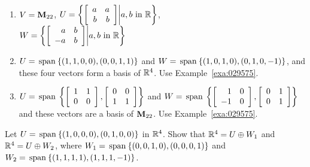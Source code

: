\begin{multicols}{2}
\begin{ex}
\begin{enumerate}[label={\alph*.}]
\item $V = \textbf{M}_{22}$, $U = \left\{ \left[ \begin{array}{rr} a & a \\ b & b \end{array} \right] \middle| a, b \mbox{ in } \mathbb{R} \right\}$, \\ $W = \left\{ \left[ \begin{array}{rr} a & b \\ -a & b \end{array} \right] \middle| a, b \mbox{ in } \mathbb{R} \right\}$

\end{enumerate}
\begin{sol}
\begin{enumerate}[label={\alph*.}]
\setcounter{enumi}{1}
\item $U = \thinspace\operatorname{span\medspace}\{(1, 1, 0, 0), (0, 0, 1, 1)\}$ and $W = \thinspace\operatorname{span\medspace}\{(1, 0, 1, 0), (0, 1, 0, -1)\}$, and these four vectors form a basis of $\mathbb{R}^4$. Use Example~\ref{exa:029575}.

\setcounter{enumi}{3}
\item $U = \thinspace\operatorname{span \medspace} \left\{ \left[ \begin{array}{rr} 1 & 1 \\ 0 & 0 \end{array} \right], \left[ \begin{array}{rr} 0 & 0 \\ 1 & 1 \end{array} \right] \right\}$ and $W = \thinspace\operatorname{span \medspace} \left\{ \left[ \begin{array}{rr} 1 & 0 \\ -1 & 0 \end{array} \right], \left[ \begin{array}{rr} 0 & 1 \\ 0 & 1 \end{array} \right] \right\}$ and these vectors are a basis of $\textbf{M}_{22}$. Use Example~\ref{exa:029575}.

\end{enumerate}
\end{sol}
\end{ex}

\begin{ex}
Let $U = \thinspace\operatorname{span\medspace}\{(1, 0, 0, 0), (0, 1, 0, 0)\}$ in $\mathbb{R}^4$. Show that $\mathbb{R}^4 = U \oplus W_{1}$ and $\mathbb{R}^4 = U \oplus W_{2}$, where $W_{1} = \thinspace\operatorname{span\medspace}\{(0, 0, 1, 0), (0, 0, 0, 1)\}$ and $W_{2} = \thinspace\operatorname{span\medspace}\{(1, 1, 1, 1), (1, 1, 1, -1)\}$.
\end{ex}


\end{multicols}
